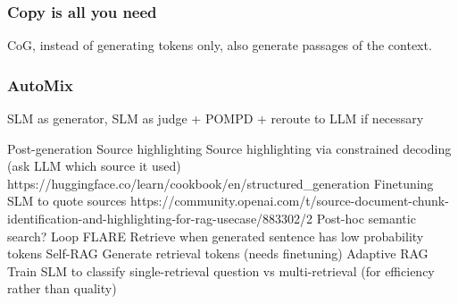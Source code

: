 \subsubsection{Copy is all you need}
CoG, instead of generating tokens only, also generate passages of the context.

\subsubsection{AutoMix}
SLM as generator, SLM as judge + POMPD + reroute to LLM if necessary

Post-generation
Source highlighting
	Source highlighting via constrained decoding (ask LLM which source it used)
	https://huggingface.co/learn/cookbook/en/structured\_generation
	Finetuning SLM to quote sources
https://community.openai.com/t/source-document-chunk-identification-and-highlighting-for-rag-usecase/883302/2
Post-hoc semantic search?
Loop
FLARE
	Retrieve when generated sentence has low probability tokens
Self-RAG
	Generate retrieval tokens (needs finetuning)
Adaptive RAG
Train SLM to classify single-retrieval question vs multi-retrieval (for efficiency rather than quality)